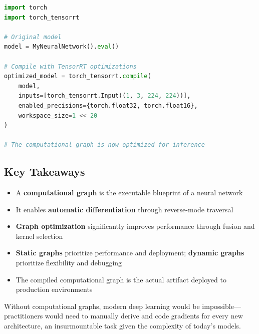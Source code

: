 \documentclass[11pt]{article}
\begin{document}
\begin{lstlisting}[language=Python, caption=Graph optimization with PyTorch and TensorRT]
import torch
import torch_tensorrt

# Original model
model = MyNeuralNetwork().eval()

# Compile with TensorRT optimizations
optimized_model = torch_tensorrt.compile(
    model,
    inputs=[torch_tensorrt.Input((1, 3, 224, 224))],
    enabled_precisions={torch.float32, torch.float16},
    workspace_size=1 << 20
)

# The computational graph is now optimized for inference
\end{lstlisting}

\subsection{Key Takeaways}

\begin{itemize}
    \item A \textbf{computational graph} is the executable blueprint of a neural network
    \item It enables \textbf{automatic differentiation} through reverse-mode traversal
    \item \textbf{Graph optimization} significantly improves performance through fusion and kernel selection
    \item \textbf{Static graphs} prioritize performance and deployment; \textbf{dynamic graphs} prioritize flexibility and debugging
    \item The compiled computational graph is the actual artifact deployed to production environments
\end{itemize}

Without computational graphs, modern deep learning would be impossible—practitioners would need to manually derive and code gradients for every new architecture, an insurmountable task given the complexity of today's models.
\end{document}
